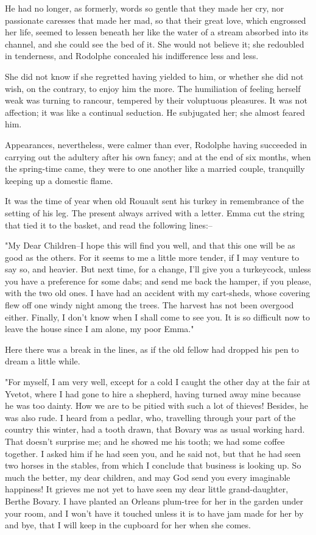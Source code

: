 \documentclass[11pt,twocolumn]{ltugboat}
\begin{document}
He had no longer, as formerly, words so gentle that they made her cry,
nor passionate caresses that made her mad, so that their great love,
which engrossed her life, seemed to lessen beneath her like the water of
a stream absorbed into its channel, and she could see the bed of it.
She would not believe it; she redoubled in tenderness, and Rodolphe
concealed his indifference less and less.

She did not know if she regretted having yielded to him, or whether she
did not wish, on the contrary, to enjoy him the more. The humiliation
of feeling herself weak was turning to rancour, tempered by their
voluptuous pleasures. It was not affection; it was like a continual
seduction. He subjugated her; she almost feared him.

Appearances, nevertheless, were calmer than ever, Rodolphe having
succeeded in carrying out the adultery after his own fancy; and at the
end of six months, when the spring-time came, they were to one another
like a married couple, tranquilly keeping up a domestic flame.

It was the time of year when old Rouault sent his turkey in remembrance
of the setting of his leg. The present always arrived with a letter.
Emma cut the string that tied it to the basket, and read the following
lines:--

"My Dear Children--I hope this will find you well, and that this one
will be as good as the others. For it seems to me a little more tender,
if I may venture to say so, and heavier. But next time, for a change,
I'll give you a turkeycock, unless you have a preference for some dabs;
and send me back the hamper, if you please, with the two old ones. I
have had an accident with my cart-sheds, whose covering flew off one
windy night among the trees. The harvest has not been overgood either.
Finally, I don't know when I shall come to see you. It is so difficult
now to leave the house since I am alone, my poor Emma."

Here there was a break in the lines, as if the old fellow had dropped
his pen to dream a little while.

"For myself, I am very well, except for a cold I caught the other day at
the fair at Yvetot, where I had gone to hire a shepherd, having turned
away mine because he was too dainty. How we are to be pitied with such
a lot of thieves! Besides, he was also rude. I heard from a pedlar, who,
travelling through your part of the country this winter, had a tooth
drawn, that Bovary was as usual working hard. That doesn't surprise me;
and he showed me his tooth; we had some coffee together. I asked him if
he had seen you, and he said not, but that he had seen two horses in the
stables, from which I conclude that business is looking up. So much
the better, my dear children, and may God send you every imaginable
happiness! It grieves me not yet to have seen my dear little
grand-daughter, Berthe Bovary. I have planted an Orleans plum-tree for
her in the garden under your room, and I won't have it touched unless it
is to have jam made for her by and bye, that I will keep in the cupboard
for her when she comes.
\end{document}
